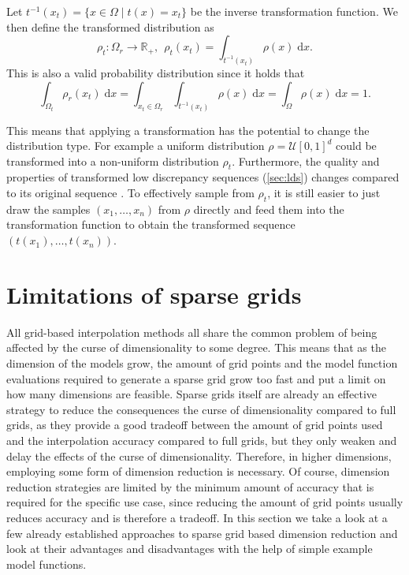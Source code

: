 \documentclass[
  a4paper,  %
  twoside,  %
  bibliography=totoc,
  headsepline,
  cleardoublepage=empty,
  parskip=half,
  draft=false
]{scrbook}
\begin{document}
\begin{definition}
Let $t^{-1}(x_{t})=\{x \in \Omega \mid t(x)=x_{t}\}$ be the inverse transformation function.
We then define the transformed distribution as
\begin{equation}
\rho_t \colon \Omega_r \to \mathds{R_+}, ~~ \rho_t(x_t)=\int_{t^{-1}(x_t)} \rho(x) \; \mathrm{d}x.
\end{equation}
This is also a valid probability distribution since it holds that
\begin{equation}
\int_{\Omega_t} \rho_r(x_t) \; \mathrm{d}x=\int_{x_t \in \Omega_r} \int_{t^{-1}(x_t)} \rho(x) \; \mathrm{d}x = \int_{\Omega} \rho(x) \; \mathrm{d}x = 1.
\end{equation}
\end{definition}
%
This means that applying a transformation has the potential to change the distribution type.
For example a uniform distribution $\rho=\mathcal{U}[0,1]^d$ could be transformed into a non-uniform distribution $\rho_t$.
Furthermore, the quality and properties of transformed low discrepancy sequences (\cref{sec:lds}) changes compared to its original sequence \cite{Wang2008}.
To effectively sample from $\rho_t$, it is still easier to just draw the samples $(x_1, \dots, x_n)$ from $\rho$ directly and feed them into the transformation function to obtain the transformed sequence $(t(x_1), \dots, t(x_n))$.

\section{Limitations of sparse grids}

All grid-based interpolation methods all share the common problem of being affected by the curse of dimensionality \cite{Bellman2015} to some degree.
This means that as the dimension of the models grow, the amount of grid points and the model function evaluations required to generate a sparse grid grow too fast and put a limit on how many dimensions are feasible.
Sparse grids itself are already an effective strategy to reduce the consequences the curse of dimensionality compared to full grids, as they provide a good tradeoff between the amount of grid points used and the interpolation accuracy compared to full grids, but they only weaken and delay the effects of the curse of dimensionality.
Therefore, in higher dimensions, employing some form of dimension reduction is necessary.
Of course, dimension reduction strategies are limited by the minimum amount of accuracy that is required for the specific use case, since reducing the amount of grid points usually reduces accuracy and is therefore a tradeoff.
In this section we take a look at a few already established approaches to sparse grid based dimension reduction and look at their advantages and disadvantages with the help of simple example model functions.
\end{document}
